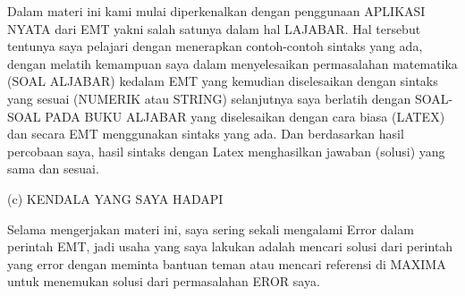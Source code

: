 \documentclass[a4paper,10pt]{article}
\begin{document}
\begin{eulernotebook}
\begin{eulercomment}
\begin{eulercomment}
\begin{eulercomment}
Dalam materi ini kami mulai diperkenalkan dengan penggunaan APLIKASI NYATA dari EMT yakni
salah satunya dalam hal LAJABAR. Hal tersebut tentunya saya pelajari dengan menerapkan
contoh-contoh sintaks yang ada, dengan melatih kemampuan saya dalam menyelesaikan
permasalahan matematika (SOAL ALJABAR) kedalam EMT yang kemudian diselesaikan dengan sintaks
yang sesuai (NUMERIK atau STRING) selanjutnya saya berlatih dengan SOAL-SOAL PADA BUKU
ALJABAR yang diselesaikan dengan cara biasa (LATEX) dan secara EMT menggunakan sintaks yang
ada. Dan berdasarkan hasil percobaan saya, hasil sintaks dengan Latex menghasilkan jawaban
(solusi) yang sama dan sesuai.


(c) KENDALA YANG SAYA HADAPI 

Selama mengerjakan materi ini, saya sering sekali mengalami Error dalam perintah EMT, jadi
usaha yang saya lakukan adalah mencari solusi dari perintah yang error dengan meminta bantuan
teman atau mencari referensi di MAXIMA untuk menemukan solusi dari permasalahan EROR saya.




\end{eulercomment}
\end{eulercomment}
\end{eulercomment}
\end{eulernotebook}
\end{document}
